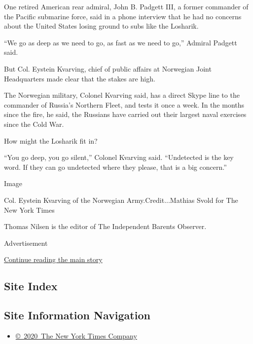 One retired American rear admiral, John B. Padgett III, a former
commander of the Pacific submarine force, said in a phone interview that
he had no concerns about the United States losing ground to subs like
the Losharik.

``We go as deep as we need to go, as fast as we need to go,'' Admiral
Padgett said.

But Col. Eystein Kvarving, chief of public affairs at Norwegian Joint
Headquarters made clear that the stakes are high.

The Norwegian military, Colonel Kvarving said, has a direct Skype line
to the commander of Russia's Northern Fleet, and tests it once a week.
In the months since the fire, he said, the Russians have carried out
their largest naval exercises since the Cold War.

How might the Losharik fit in?

``You go deep, you go silent,'' Colonel Kvarving said. ``Undetected is
the key word. If they can go undetected where they please, that is a big
concern.''

Image

Col. Eystein Kvarving of the Norwegian Army.Credit...Mathias Svold for
The New York Times

Thomas Nilsen is the editor of The Independent Barents Observer.

Advertisement

\protect\hyperlink{after-bottom}{Continue reading the main story}

\hypertarget{site-index}{%
\subsection{Site Index}\label{site-index}}

\hypertarget{site-information-navigation}{%
\subsection{Site Information
Navigation}\label{site-information-navigation}}

\begin{itemize}
\tightlist
\item
  \href{https://help.nytimes.com/hc/en-us/articles/115014792127-Copyright-notice}{©~2020~The
  New York Times Company}
\end{itemize}

